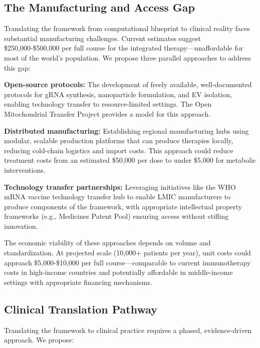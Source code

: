 \documentclass[12pt,a4paper]{article}
\begin{document}
\subsection{The Manufacturing and Access Gap}

Translating the framework from computational blueprint to clinical reality faces substantial manufacturing challenges. Current estimates suggest \$250,000-\$500,000 per full course for the integrated therapy—unaffordable for most of the world's population. We propose three parallel approaches to address this gap:

\textbf{Open-source protocols:} The development of freely available, well-documented protocols for gRNA synthesis, nanoparticle formulation, and EV isolation, enabling technology transfer to resource-limited settings. The Open Mitochondrial Transfer Project \citep{openmt2023} provides a model for this approach.

\textbf{Distributed manufacturing:} Establishing regional manufacturing hubs using modular, scalable production platforms that can produce therapies locally, reducing cold-chain logistics and import costs. This approach could reduce treatment costs from an estimated \$50,000 per dose to under \$5,000 for metabolic interventions.

\textbf{Technology transfer partnerships:} Leveraging initiatives like the WHO mRNA vaccine technology transfer hub to enable LMIC manufacturers to produce components of the framework, with appropriate intellectual property frameworks (e.g., Medicines Patent Pool) ensuring access without stifling innovation.

The economic viability of these approaches depends on volume and standardization. At projected scale (10,000+ patients per year), unit costs could approach \$5,000-\$10,000 per full course—comparable to current immunotherapy costs in high-income countries and potentially affordable in middle-income settings with appropriate financing mechanisms.

\subsection{Clinical Translation Pathway}

Translating the framework to clinical practice requires a phased, evidence-driven approach. We propose:
\end{document}
